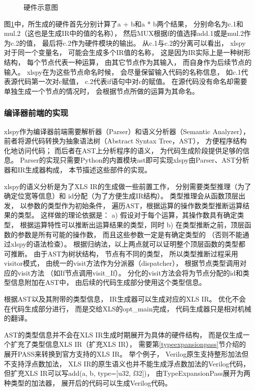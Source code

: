 \begin{figure}[h]
\centering

\caption{硬件示意图}
\label{fig.1}
\end{figure}

图\ref{fig.1}中，所生成的硬件首先分别计算了a + b和a * b两个结果，
分别命名为c.1和mul.2（这也是生成IR中的值的名称），
然后MUX根据f的值选择add.1或是mul.2作为c.2的值，
最后将c.2作为硬件模块的输出。
从c.1与c.2的分离可以看出，
xlspy对于同一个变量名，
可能会生成多个IR值的名称，
这是因为IR实际上是一种树形结构，
每个节点代表一种运算，
由其它节点作为其输入，
而自身作为后续节点的输入。
xlspy在为这些节点命名时候，
会尽量保留输入代码的名称信息，
如c.1代表源代码第一次对c赋值，
c.2代表if语句中对c的赋值。
在源代码没有命名却需要单独生成一个节点的情况时，
会根据节点所做的运算为其命名。

\subsubsection{编译器前端的实现}

xlspy作为编译器前端需要解析器（Parser）和语义分析器（Semantic Analyzer），
前者将源代码转换为抽象语法树（Abstract Syntax Tree，AST），
方便程序结构化地访问代码；
而后者在AST上分析程序的语义，
为代码生成阶段提供足够的信息。
Parser的实现只需要Python的内置模块ast即可实现xlspy由Parser、AST分析器和IR生成器构成，
本节描述这些部件的实现。

xlspy的语义分析是为了XLS IR的生成做一些前置工作，
分别需要类型推理（为了确定位宽等信息）和
id分配（为了方便生成IR结构）。
类型推理会从函数顶层出发，
以参数的类型作为初始条件，
遍历AST，根据运算的操作数类型推断运算结果的类型。
这样做的理论依据是：
a) 假设对于每个运算，其操作数具有确定类型，
根据运算特性可以推断出运算结果的类型，同时
b) 在类型推断之前，顶层函数的参数是所有可能的操作数，
而且这些参数一定是有确定类型的
（否则不能通过xlspy的语法检查）。
根据归纳法，以上两点就可以证明整个顶层函数的类型都可推断。
由于AST为树状结构，
节点有不同的类型，
所以类型推断过程采用visitor模式，
由统一的visit方法作为分派器（dispatcher），
根据节点类型调用对应的visit方法
（如If节点调用visit\_If）。
分化的visit方法会将为节点分配的id和类型信息附加在AST中，
由后续的代码生成部分使用这个类型信息。

根据AST以及其附带的类型信息，
IR生成器可以生成对应的XLS IR。
优化不会在代码生成部分进行，
而是交给XLS的opt\_main完成，
代码生成器只是相对机械的翻译。

AST的类型信息并不会在XLS IR生成时期展开为具体的硬件结构，
而是仅生成一个扩充了类型信息XLS IR（扩充XLS IR），
需要第\ref{typeexpansionpass}节介绍的展开PASS来转换到官方支持的XLS IR。
举个例子，
Verilog原生支持整形加法但不支持浮点数加法，
XLS IR的原生语义也并不能生成浮点数加法的Verilog代码，
但扩充XLS IR可以写add(a, b, type=[u32, f32])，
由TypeExpansionPass展开为两种类型的加法器，
展开后的代码可以生成Verilog代码。

